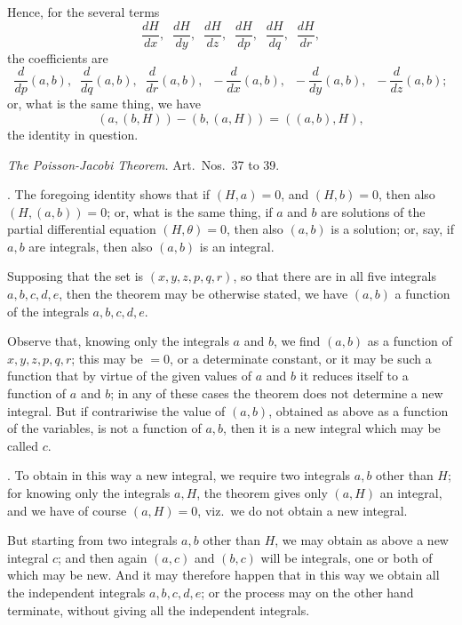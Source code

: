 \documentclass[11pt,a4paper]{article}
\begin{document}
Hence, for the several terms
\[
\frac{dH}{dx}, \;\; \frac{dH}{dy}, \;\; \frac{dH}{dz}, \;\; \frac{dH}{dp}, \;\; \frac{dH}{dq}, \;\; \frac{dH}{dr},
\]
the coefficients are
\[
\frac{d}{dp}(a, b), \;\; \frac{d}{dq}(a, b), \;\; \frac{d}{dr}(a, b), \;\; -\frac{d}{dx}(a, b), \;\; -\frac{d}{dy}(a, b), \;\; -\frac{d}{dz}(a, b);
\]
or, what is the same thing, we have
\[
(a, (b, H)) - (b, (a, H)) = ((a, b), H),
\]
the identity in question.

\bigskip

\begin{center}
\emph{The Poisson-Jacobi Theorem.} Art.\ Nos.\ 37 to 39.
\end{center}

\medskip

. The foregoing identity shows that if $(H, a) = 0$, and $(H, b) = 0$, then also $(H, (a, b)) = 0$; or, what is the same thing, if $a$ and $b$ are solutions of the partial differential equation $(H, \theta) = 0$, then also $(a, b)$ is a solution; or, say, if $a, b$ are integrals, then also $(a, b)$ is an integral.

\newpage


Supposing that the set is $(x, y, z, p, q, r)$, so that there are in all five integrals $a, b, c, d, e$, then the theorem may be otherwise stated, we have $(a, b)$ a function of the integrals $a, b, c, d, e$.

Observe that, knowing only the integrals $a$ and $b$, we find $(a, b)$ as a function of $x, y, z, p, q, r$; this may be $= 0$, or a determinate constant, or it may be such a function that by virtue of the given values of $a$ and $b$ it reduces itself to a function of $a$ and $b$; in any of these cases the theorem does not determine a new integral. But if contrariwise the value of $(a, b)$, obtained as above as a function of the variables, is not a function of $a, b$, then it is a new integral which may be called $c$.

\medskip

. To obtain in this way a new integral, we require two integrals $a, b$ other than $H$; for knowing only the integrals $a, H$, the theorem gives only $(a, H)$ an integral, and we have of course $(a, H) = 0$, viz.\ we do not obtain a new integral.

But starting from two integrals $a, b$ other than $H$, we may obtain as above a new integral $c$; and then again $(a, c)$ and $(b, c)$ will be integrals, one or both of which may be new. And it may therefore happen that in this way we obtain all the independent integrals $a, b, c, d, e$; or the process may on the other hand terminate, without giving all the independent integrals.
\end{document}
